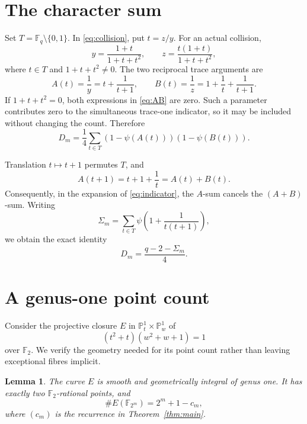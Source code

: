 \documentclass[11pt]{article}
\newtheorem{lemma}[theorem]{Lemma}
\newcommand{\F}{\mathbb F}
\begin{document}
\section{The character sum}

Set $T=\F_q\setminus\{0,1\}$.  In \eqref{eq:collision}, put $t=z/y$.
For an actual collision,
\begin{equation}\label{eq:param}
 y=\frac{1+t}{1+t+t^2},\qquad
 z=\frac{t(1+t)}{1+t+t^2},
\end{equation}
where $t\in T$ and $1+t+t^2\ne0$.  The two reciprocal trace arguments are
\begin{equation}\label{eq:AB}
 A(t)=\frac1y=t+\frac1{t+1},\qquad
 B(t)=\frac1z=1+\frac1t+\frac1{t+1}.
\end{equation}
If $1+t+t^2=0$, both expressions in \eqref{eq:AB} are zero.  Such a
parameter contributes zero to the simultaneous trace-one indicator, so it
may be included without changing the count.  Therefore
\begin{equation}\label{eq:indicator}
 D_m=\frac14\sum_{t\in T}
       (1-\psi(A(t)))(1-\psi(B(t))).
\end{equation}

Translation $t\mapsto t+1$ permutes $T$, and
\[
 A(t+1)=t+1+\frac1t=A(t)+B(t).
\]
Consequently, in the expansion of \eqref{eq:indicator}, the $A$-sum
cancels the $(A+B)$-sum.  Writing
\begin{equation}\label{eq:sigma}
 \Sigma_m=\sum_{t\in T}
 \psi\!\left(1+\frac1{t(t+1)}\right),
\end{equation}
we obtain the exact identity
\begin{equation}\label{eq:D-sigma}
 D_m=\frac{q-2-\Sigma_m}{4}.
\end{equation}

\section{A genus-one point count}

Consider the projective closure $E$ in
$\mathbb P^1_t\times\mathbb P^1_w$ of
\begin{equation}\label{eq:curve}
 (t^2+t)(w^2+w+1)=1
\end{equation}
over $\F_2$.  We verify the geometry needed for its point count rather than
leaving exceptional fibres implicit.

\begin{lemma}\label{lem:curve}
The curve $E$ is smooth and geometrically integral of genus one.  It has
exactly two $\F_2$-rational points, and
\begin{equation}\label{eq:E-count}
 \#E(\F_{2^m})=2^m+1-c_m,
\end{equation}
where $(c_m)$ is the recurrence in Theorem~\ref{thm:main}.
\end{lemma}
\end{document}
